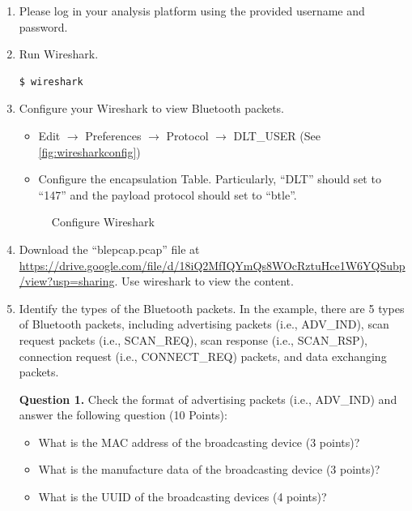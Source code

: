 \documentclass[11pt]{article}
\begin{document}
\begin{enumerate}
\item Please log in your analysis platform using the provided username and password. 
\item Run \textsf{Wireshark}.
 \begin{lstlisting}
$ wireshark
\end{lstlisting}\vspace{-6mm}
\item Configure your \textsf{Wireshark} to view Bluetooth packets. 
\begin{itemize}
\item Edit $\longrightarrow$ Preferences $\longrightarrow$ Protocol $\longrightarrow$ DLT\_USER (See \autoref{fig:wiresharkconfig}) 
\item Configure the encapsulation Table. Particularly, ``DLT'' should set to ``147'' and the payload protocol should set to ``btle''. 
\end{itemize}

\begin{figure}[h]
\centering
{}
\caption{\textsf{Configure \textsf{Wireshark}}}\label{fig:wiresharkconfig}
\end{figure}


\item Download the ``blepcap.pcap'' file at \url{https://drive.google.com/file/d/18iQ2MfIQYmQs8WOcRztuHce1W6YQSubp/view?usp=sharing}. Use \textsf{wireshark} to view the content. 

\item Identify the types of the Bluetooth packets. In the example, there are 5 types of Bluetooth packets, including advertising packets (i.e., \textsf{ADV\_IND}), scan request packets (i.e., \textsf{SCAN\_REQ}), scan response (i.e., \textsf{SCAN\_RSP}), connection request (i.e., \textsf{CONNECT\_REQ}) packets, and data exchanging packets.


\textbf{Question 1.} Check the format of advertising packets (i.e., \textsf{ADV\_IND}) and answer the following question (10 Points):
\begin{itemize}
\item What is the MAC address of the broadcasting device (3 points)? 
\item What is the manufacture data of the broadcasting device (3 points)?
\item What is the UUID of the broadcasting devices (4 points)?
\end{itemize}


\end{enumerate}
\end{document}
